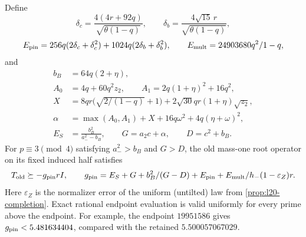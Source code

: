 \begin{proposition}
\label{imp:local:collision-gap}
Define
\[
 \delta_c=\frac{4(4r+92q)}{\sqrt{\theta(1-q)}},
 \qquad \delta_b=\frac{4\sqrt{15}\,r}{\sqrt{\theta(1-q)}},
\]
\begin{equation}\label{eq:merge-local-I-16}
 E_{\rm pin}=256q(2\delta_c+\delta_c^2)
              +1024q(2\delta_b+\delta_b^2),\qquad
 E_{\rm mult}=\frac{24903680q^2}{1-q},
\end{equation}
and
\begin{equation}\label{eq:merge-local-I-17}
 \begin{aligned}
 b_B&=64q(2+\eta),\\
 A_0&=4q+60q^2z_2,\qquad
 A_1=2q(1+\eta)^2+16q^2,\\
 X&=8qr\bigl(\sqrt{2/(1-q)}+1\bigr)
                +2\sqrt{30}qr(1+\eta)\sqrt{z_2},\\
 \alpha&=\max(A_0,A_1)+X+16q\omega^2+4q(\eta+\omega)^2,\\
 E_S&=\frac{b_B^2}{a_-^2-b_B},\qquad
 G=a_2c+\alpha,\qquad D=c^2+b_B .
 \end{aligned}
\end{equation}
For $p\equiv3\pmod4$ satisfying $a_-^2>b_B$ and $G>D$, the old mass-one root operator
on its fixed induced half satisfies
\begin{equation}\label{eq:merge-local-I-18}
 T_{\rm old}\succeq-g_{\rm pin}rI,\qquad
 g_{\rm pin}=
 \frac{E_S+G+b_B^2/(G-D)+E_{\rm pin}+E_{\rm mult}}
      {h_-(1-\varepsilon_Z)r}.
\end{equation}
Here $\varepsilon_Z$ is the normalizer error of the uniform
(untilted) law from \cref{prop:l20-completion}. Exact rational endpoint evaluation is valid uniformly
for every prime above the endpoint. For example, the endpoint $19951586$ gives
$g_{\rm pin}<5.481634404$, compared with the retained
$5.500057067029$.
\end{proposition}

